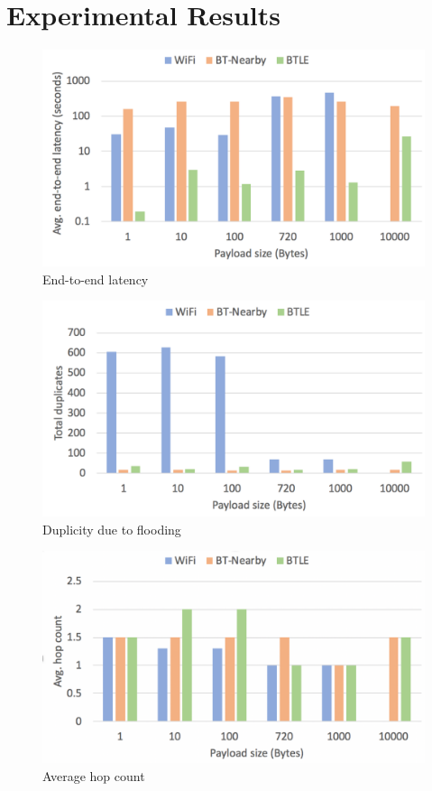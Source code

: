 \documentclass[conference]{IEEEtran}
\begin{document}
\section{Experimental Results}
\label{sec:eval}

\begin{figure}[htbp]
\centerline{\includegraphics[width=\columnwidth]{figs/e2e_latency}}
\caption{End-to-end latency}
\label{fig:e2e}
\end{figure}

\begin{figure}[htbp]
\centerline{\includegraphics[width=\columnwidth]{figs/duplicates}}
\caption{Duplicity due to flooding}
\label{fig:dup}
\end{figure}

\begin{figure}[htbp]
\centerline{\includegraphics[width=\columnwidth]{figs/hops}}
\caption{Average hop count}
\label{fig:hop}
\end{figure}
\end{document}

